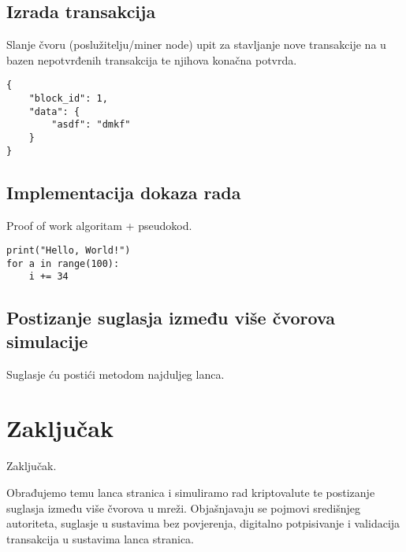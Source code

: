 \documentclass[utf8, zavrsni]{fer}
\begin{document}
\section{Izrada transakcija}
Slanje čvoru (poslužitelju/miner node) upit za stavljanje nove transakcije na u bazen nepotvrđenih transakcija te njihova konačna potvrda.
\begin{verbatim}
{
	"block_id": 1,
	"data": {
		"asdf": "dmkf"
	}
}
\end{verbatim}

\section{Implementacija dokaza rada}
Proof of work algoritam + pseudokod.

\begin{verbatim}
print("Hello, World!")
for a in range(100):
	i += 34
\end{verbatim}

\section{Postizanje suglasja između više čvorova simulacije}
Suglasje ću postići metodom najduljeg lanca.


\chapter{Zaključak}
Zaključak.





\begin{sazetak}
	Obrađujemo temu lanca stranica i simuliramo rad kriptovalute te postizanje suglasja između više čvorova u mreži. Objašnjavaju se pojmovi središnjeg autoriteta, suglasje u sustavima bez povjerenja, digitalno potpisivanje i validacija transakcija u sustavima lanca stranica.

\end{sazetak}

\begin{abstract}
	
\end{abstract}
\end{document}

